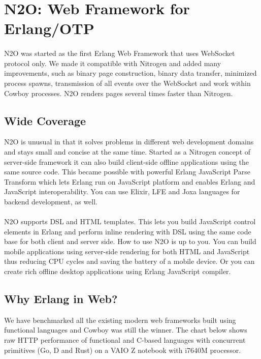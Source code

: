\section{N2O: Web Framework for Erlang/OTP}

\paragraph{}
N2O was started as the first Erlang Web Framework
that uses WebSocket protocol only. We made it compatible with Nitrogen
and added many improvements, such as binary page construction,
binary data transfer, minimized process spawns, transmission of all events over the WebSocket
and work within Cowboy processes. N2O renders pages several times faster than Nitrogen.

\subsection{Wide Coverage}
N2O is unusual in that it solves problems in different web development domains
and stays small and concise at the same time. Started as a Nitrogen concept
of server-side framework it can also build client-side offline applications
using the same source code. This became possible with powerful Erlang JavaScript Parse
Transform which lets Erlang run on JavaScript platform and enables Erlang and JavaScript
interoperability. You can use Elixir, LFE and Joxa languages for backend development, as well.

\paragraph{}
N2O supports DSL and HTML templates. This lets you build JavaScript
control elements in Erlang and perform inline rendering with DSL using
the same code base for both client and server side.
How to use N2O is up to you. You can build mobile applications using server-side rendering
for both HTML and JavaScript thus reducing CPU cycles and saving the battery of a mobile device.
Or you can create rich offline desktop applications using Erlang JavaScript compiler.

\newpage
\subsection*{Why Erlang in Web?}
We have benchmarked all the existing modern web frameworks built using functional
languages and Cowboy was still the winner. The chart below shows raw HTTP
performance of functional and C-based languages with concurrent
primitives (Go, D and Rust) on a VAIO Z notebook with i7640M processor.

